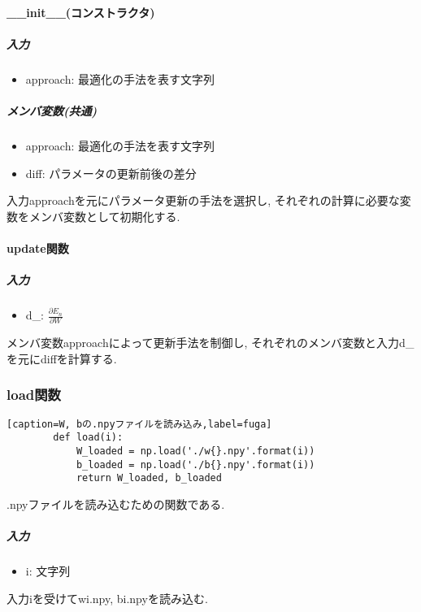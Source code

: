\documentclass[a4j, titlepage]{jarticle}
\begin{document}
        \paragraph*{\_\_init\_\_(コンストラクタ)}
            \subparagraph*{入力}
            \begin{itemize}
                \item approach: 最適化の手法を表す文字列
            \end{itemize}
            \subparagraph*{メンバ変数(共通)}
            \begin{itemize}
                \item approach: 最適化の手法を表す文字列
                \item diff: パラメータの更新前後の差分
            \end{itemize}
            入力approachを元にパラメータ更新の手法を選択し, それぞれの計算に必要な変数をメンバ変数として初期化する.
        \paragraph*{update関数}
            \subparagraph*{入力}
            \begin{itemize}
                \item d\_: \(\displaystyle \frac{\partial E_n}{\partial W}\)
            \end{itemize}
            メンバ変数approachによって更新手法を制御し, それぞれのメンバ変数と入力d\_を元にdiffを計算する.


    \subsubsection{load関数}
        \begin{lstlisting}[caption=W, bの.npyファイルを読み込み,label=fuga]
        def load(i):
            W_loaded = np.load('./w{}.npy'.format(i))
            b_loaded = np.load('./b{}.npy'.format(i))
            return W_loaded, b_loaded
        \end{lstlisting}
        .npyファイルを読み込むための関数である.
            \subparagraph*{入力}
            \begin{itemize}
                \item i: 文字列
            \end{itemize}
            入力iを受けてwi.npy, bi.npyを読み込む.
\end{document}
